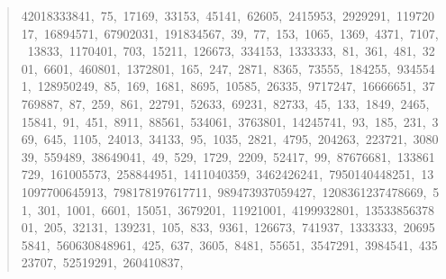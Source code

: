 \documentclass[11pt]{article}
\begin{document}
\begin{enumerate}
\begin{quote}
42018333841,\allowbreak\ 75,\allowbreak\ 17169,\allowbreak\ 33153,\allowbreak\ 45141,\allowbreak\
62605,\allowbreak\ 2415953,\allowbreak\ 2929291,\allowbreak\ 11972017,\allowbreak\ 16894571,\allowbreak\
67902031,\allowbreak\ 191834567,\allowbreak\ 39,\allowbreak\ 77,\allowbreak\ 153,\allowbreak\
1065,\allowbreak\ 1369,\allowbreak\ 4371,\allowbreak\ 7107,\allowbreak\ 13833,\allowbreak\
1170401,\allowbreak\ 703,\allowbreak\ 15211,\allowbreak\ 126673,\allowbreak\ 334153,\allowbreak\
1333333,\allowbreak\ 81,\allowbreak\ 361,\allowbreak\ 481,\allowbreak\ 3201,\allowbreak\ 6601,\allowbreak\
460801,\allowbreak\ 1372801,\allowbreak\ 165,\allowbreak\ 247,\allowbreak\ 2871,\allowbreak\
8365,\allowbreak\ 73555,\allowbreak\ 184255,\allowbreak\ 9345541,\allowbreak\ 128950249,\allowbreak\
85,\allowbreak\ 169,\allowbreak\ 1681,\allowbreak\ 8695,\allowbreak\ 10585,\allowbreak\ 26335,\allowbreak\
9717247,\allowbreak\ 16666651,\allowbreak\ 37769887,\allowbreak\ 87,\allowbreak\ 259,\allowbreak\
861,\allowbreak\ 22791,\allowbreak\ 52633,\allowbreak\ 69231,\allowbreak\ 82733,\allowbreak\ 45,\allowbreak\
133,\allowbreak\ 1849,\allowbreak\ 2465,\allowbreak\ 15841,\allowbreak\ 91,\allowbreak\ 451,\allowbreak\
8911,\allowbreak\ 88561,\allowbreak\ 534061,\allowbreak\ 3763801,\allowbreak\ 14245741,\allowbreak\
93,\allowbreak\ 185,\allowbreak\ 231,\allowbreak\ 369,\allowbreak\ 645,\allowbreak\ 1105,\allowbreak\
24013,\allowbreak\ 34133,\allowbreak\ 95,\allowbreak\ 1035,\allowbreak\ 2821,\allowbreak\ 4795,\allowbreak\
204263,\allowbreak\ 223721,\allowbreak\ 308039,\allowbreak\ 559489,\allowbreak\ 38649041,\allowbreak\
49,\allowbreak\ 529,\allowbreak\ 1729,\allowbreak\ 2209,\allowbreak\ 52417,\allowbreak\ 99,\allowbreak\
87676681,\allowbreak\ 133861729,\allowbreak\ 161005573,\allowbreak\ 258844951,\allowbreak\
1411040359,\allowbreak\ 3462426241,\allowbreak\ 7950140448251,\allowbreak\ 131097700645913,\allowbreak\
798178197617711,\allowbreak\ 989473937059427,\allowbreak\ 1208361237478669,\allowbreak\ 51,\allowbreak\
301,\allowbreak\ 1001,\allowbreak\ 6601,\allowbreak\ 15051,\allowbreak\ 3679201,\allowbreak\
11921001,\allowbreak\ 4199932801,\allowbreak\ 1353385637801,\allowbreak\ 205,\allowbreak\ 32131,\allowbreak\
139231,\allowbreak\ 105,\allowbreak\ 833,\allowbreak\ 9361,\allowbreak\ 126673,\allowbreak\
741937,\allowbreak\ 1333333,\allowbreak\ 206955841,\allowbreak\ 560630848961,\allowbreak\ 425,\allowbreak\
637,\allowbreak\ 3605,\allowbreak\ 8481,\allowbreak\ 55651,\allowbreak\ 3547291,\allowbreak\
3984541,\allowbreak\ 43523707,\allowbreak\ 52519291,\allowbreak\ 260410837,\allowbreak\

\end{quote}
\end{enumerate}
\end{document}
